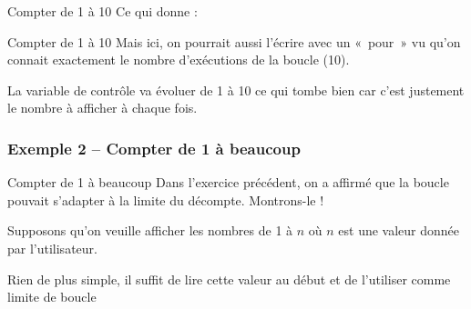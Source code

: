 \begin{frame}{Compter de 1 à 10}
	Ce qui donne :

\end{frame}

\begin{frame}{Compter de 1 à 10}
	Mais ici, on pourrait aussi l'écrire avec un «~pour~» vu qu'on
	connait exactement le nombre d'exécutions de la boucle (10). 
	
	\medskip
	
	La variable de contrôle va évoluer de 1 à 10 ce qui tombe bien car
	c'est justement le nombre à afficher à chaque fois.
	
	\medskip

\end{frame}

\subsubsection{Exemple 2 -- Compter de 1 à beaucoup}

\begin{frame}{Compter de 1 à beaucoup}
	Dans l'exercice précédent, on a
	affirmé que la boucle pouvait s'adapter à la limite du
	décompte. Montrons-le ! 
	
	\bigskip
	
	Supposons qu'on veuille
	afficher les nombres de 1 à $n$ où $n$ est une valeur 
	donnée par l'utilisateur.

	\bigskip

	Rien de plus simple, il suffit de lire cette
	valeur au début et de l'utiliser comme limite de boucle
\end{frame}

